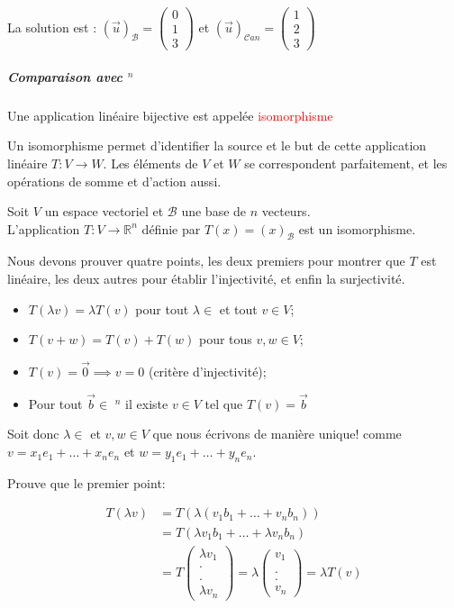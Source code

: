 La solution est :
$(\vec{u})_\mathcal{B} =  \begin{pmatrix}
    0 \\ 1 \\ 3
\end{pmatrix}$ et $(\vec{u})_{\mathcal{C}
an} = \begin{pmatrix}
    1 \\ 2 \\ 3
\end{pmatrix}$
\subparagraph{Comparaison avec \R$^n$}
\begin{definition}
    Une application linéaire bijective est appelée \textcolor{red}{isomorphisme}
\end{definition}
Un isomorphisme permet d'identifier la source et le but de cette application linéaire $T : V \to W$. Les éléments de $V$ et $W$ se correspondent parfaitement, et les opérations de somme et d'action aussi.
\begin{theoreme}
    Soit $V$ un espace vectoriel et $\mathcal{B}$ une base de $n$ vecteurs. \\
    L'application $T : V \to \mathbb{R}^n$ définie par $T(x) = (x)_{\mathcal{B}}$ est un isomorphisme.
\end{theoreme}
\begin{dem}
    Nous devons prouver quatre points, les deux premiers pour montrer que $T$ est linéaire, les deux autres pour établir l'injectivité, et enfin la surjectivité.
    \begin{itemize}
        \item $T(\lambda v) = \lambda T(v)$ pour tout $\lambda \in$ \R et tout $v \in V$;
        \item $T(v + w) = T(v) + T(w)$ pour tous $v, w \in V$;
        \item $T(v) = \vec{0} \implies v = 0$ (critère d'injectivité);
        \item Pour tout $\vec{b} \in$ \R$^n$ il existe $v \in V$ tel que $T(v) = \vec{b}$

    \end{itemize}
    Soit donc $\lambda \in$ \R et $v, w \in V$ que nous écrivons de manière unique! comme $v = x_1e_1 + \dots + x_ne_n$ et $w = y_1e_1 + \dots + y_ne_n$.
\end{dem}
Prouve que le premier point:

\begin{align*}
T(\lambda v) &= T ( \lambda(v_1b_1 + \dots + v_nb_n)) \\
&= T(\lambda v_1 b_1 + \dots + \lambda v_nb_n) \\
&= T\begin{pmatrix}
    \lambda v_1 \\
    .\\\\. \\ \lambda v_n
\end{pmatrix} = \lambda \begin{pmatrix}
    v_1 \\ \\. \\. \\v_n
\end{pmatrix} = \lambda T(v)
\end{align*}

